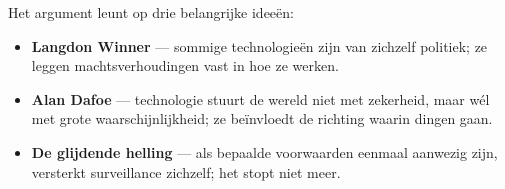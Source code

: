 \documentclass[nonacm,sigconf]{acmart}
\begin{document}
    \vertspace

    \noindent Het argument leunt op drie belangrijke ideeën:
    \begin{itemize}
        \item \textbf{Langdon Winner} — sommige technologieën zijn van zichzelf politiek; ze leggen machtsverhoudingen vast in hoe ze werken.
        \item \textbf{Alan Dafoe} — technologie stuurt de wereld niet met zekerheid, maar wél met grote waarschijnlijkheid; ze beïnvloedt de richting waarin dingen gaan.
        \item \textbf{De glijdende helling} — als bepaalde voorwaarden eenmaal aanwezig zijn, versterkt surveillance zichzelf; het stopt niet meer.
    \end{itemize}

    \vertspace {}
\end{document}

